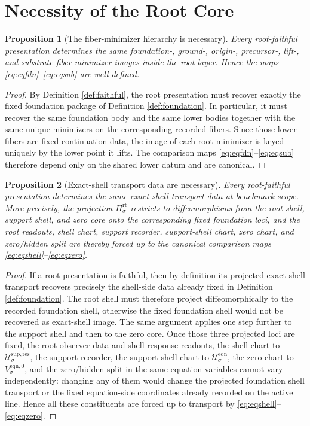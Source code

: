 \documentclass[11pt]{article}
\newcommand{\RootProj}[1]{\Pi_{#1}^{\mathrm{rt}}}
\newcommand{\ResSpace}[1]{\mathcal U_{#1}^{\mathrm{sup,res}}}
\newcommand{\EqnSpace}[1]{\mathcal U_{#1}^{\mathrm{eqn}}}
\newcommand{\EqnZero}[1]{V_{#1}^{\mathrm{eqn},0}}
\newtheorem{proposition}{Proposition}
\begin{document}
\section{Necessity of the Root Core}

\begin{proposition}[The fiber-minimizer hierarchy is necessary]
\label{prop:minimizers}
Every root-faithful presentation determines the same foundation-, ground-, origin-, precursor-, lift-, and substrate-fiber minimizer images inside the root layer. Hence the maps \eqref{eq:eqfdn}--\eqref{eq:eqsub} are well defined.
\end{proposition}

\begin{proof}
By Definition \ref{def:faithful}, the root presentation must recover exactly the fixed foundation package of Definition \ref{def:foundation}. In particular, it must recover the same foundation body and the same lower bodies together with the same unique minimizers on the corresponding recorded fibers. Since those lower fibers are fixed continuation data, the image of each root minimizer is keyed uniquely by the lower point it lifts. The comparison maps \eqref{eq:eqfdn}--\eqref{eq:eqsub} therefore depend only on the shared lower datum and are canonical.
\end{proof}

\begin{proposition}[Exact-shell transport data are necessary]
\label{prop:shell}
Every root-faithful presentation determines the same exact-shell transport data at benchmark scope. More precisely, the projection \(\RootProj{\sigma}\) restricts to diffeomorphisms from the root shell, support shell, and zero core onto the corresponding fixed foundation loci, and the root readouts, shell chart, support recorder, support-shell chart, zero chart, and zero/hidden split are thereby forced up to the canonical comparison maps \eqref{eq:eqshell}--\eqref{eq:eqzero}.
\end{proposition}

\begin{proof}
If a root presentation is faithful, then by definition its projected exact-shell transport recovers precisely the shell-side data already fixed in Definition \ref{def:foundation}. The root shell must therefore project diffeomorphically to the recorded foundation shell, otherwise the fixed foundation shell would not be recovered as exact-shell image. The same argument applies one step further to the support shell and then to the zero core. Once those three projected loci are fixed, the root observer-data and shell-response readouts, the shell chart to \(\ResSpace{\sigma}\), the support recorder, the support-shell chart to \(\EqnSpace{\sigma}\), the zero chart to \(\EqnZero{\sigma}\), and the zero/hidden split in the same equation variables cannot vary independently: changing any of them would change the projected foundation shell transport or the fixed equation-side coordinates already recorded on the active line. Hence all these constituents are forced up to transport by \eqref{eq:eqshell}--\eqref{eq:eqzero}.
\end{proof}
\end{document}
